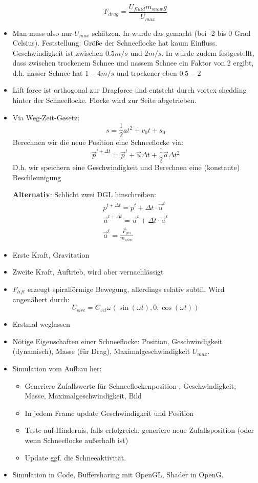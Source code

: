 \begin{itemize}
\[
F_{drag} = \frac{U_{fluid} m_{snow} g}{U_{max}}
\]
\item Man muss also nur $U_{max}$ schätzen. In \cite{Hanesch1966} wurde das
gemacht (bei -2 bis 0 Grad Celsius). Feststellung: Größe der Schneeflocke hat
kaum Einfluss. Geschwindigkeit ist zwischen $0.5m/s$ und $2m/s$. In
\cite{Canada1999} wurde zudem festgestellt, dass zwischen trockenem Schnee und
nassem Schnee ein Faktor von 2 ergibt, d.h. nasser Schnee hat $1-4m/s$ und
trockener eben $0.5-2$
\item Lift force ist orthogonal zur Dragforce und entsteht durch vortex shedding
hinter der Schneeflocke. Flocke wird zur Seite abgetrieben.
\item Via Weg-Zeit-Gesetz:
\[
s=\frac{1}{2}at^2 + v_0 t + s_0
\]
Berechnen wir die neue Position eine Schneeflocke via:
\[
\vec{p}^{t+\Delta t} = \vec{p}^t + \vec{u} \Delta t + \frac{1}{2} \vec{a} \Delta t^2
\]
D.h. wir speichern eine Geschwindigkeit und Berechnen eine (konstante) Beschleunigung

\textbf{Alternativ}: Schlicht zwei DGL hinschreiben:
\begin{gather}
p^{t + \Delta t} = p^{t} + \Delta t \cdot \vec{u}^{t} \\
\vec{u}^{t+ \Delta t} = \vec{u}^{t} + \Delta t \cdot \vec{a}^{t} \\
\vec{a}^t = \frac{\vec{F}_{ges}}{m_{snow}}
\end{gather}
\item Erste Kraft, Gravitation
\item Zweite Kraft, Auftrieb, wird aber vernachlässigt
\item $F_{lift}$ erzeugt spiralförmige Bewegung, allerdings relativ subtil. Wird angenähert durch:
\[
U_{circ} = C_{vel} \omega (\sin(\omega t),0,\cos(\omega t))
\]
\item Erstmal weglassen
\item Nötige Eigenschaften einer Schneeflocke: Position, Geschwindigkeit (dynamisch), Masse (für Drag), Maximalgeschwindigkeit $U_{max}$.
\item Simulation vom Aufbau her:
    \begin{itemize}
            \item Generiere Zufallswerte für Schneeflockenposition-,
            Geschwindigkeit, Masse, Maximalgeschwindigkeit, Bild
            \item In jedem Frame update Geschwindigkeit und Position
            \item Teste auf Hindernis, falls erfolgreich, generiere neue
            Zufallsposition (oder wenn Schneeflocke außerhalb ist)
            \item Update ggf. die Schneeaktivität.
    \end{itemize}
\item Simulation in Code, Buffersharing mit OpenGL, Shader in OpenG.
\end{itemize}

